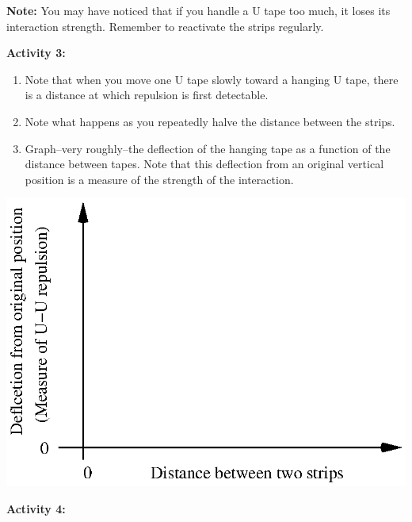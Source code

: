 \vspace{15mm}
\textbf{Note:} You may have noticed that if you handle a U tape too
much, it loses its interaction strength. Remember to reactivate the
strips regularly.

\textbf{Activity 3:}

\begin{enumerate}
\item Note that when you move one U tape slowly toward a hanging U tape,
there is a distance at which repulsion is first detectable.
\item Note what happens as you repeatedly halve the distance between the
strips.\vspace{15mm}

\item Graph--very roughly--the deflection of the hanging tape as a function
of the distance between tapes. Note that this deflection from an original
vertical position is a measure of the strength of the interaction.
\end{enumerate}
\vspace{0.3cm}
{\centering \includegraphics{int_elec_charges_fig_2.eps} \par}
\vspace{0.3cm}

\textbf{Activity 4:}

